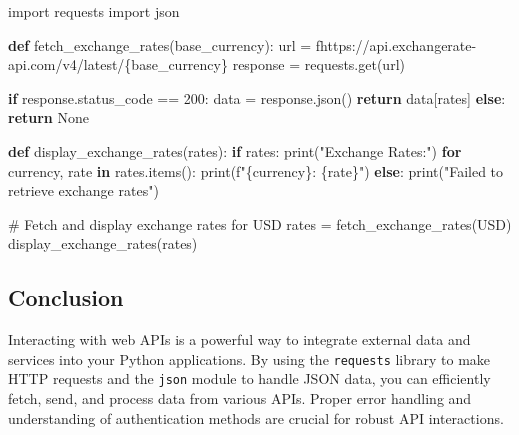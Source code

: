 \documentclass[
  letterpaper,
  DIV=11,
  numbers=noendperiod]{scrreprt}
\newenvironment{Shaded}{\begin{snugshade}}{\end{snugshade}}
\newcommand{\BuiltInTok}[1]{\textcolor[rgb]{0.00,0.23,0.31}{#1}}
\newcommand{\CommentTok}[1]{\textcolor[rgb]{0.37,0.37,0.37}{#1}}
\newcommand{\ControlFlowTok}[1]{\textcolor[rgb]{0.00,0.23,0.31}{\textbf{#1}}}
\newcommand{\DecValTok}[1]{\textcolor[rgb]{0.68,0.00,0.00}{#1}}
\newcommand{\ImportTok}[1]{\textcolor[rgb]{0.00,0.46,0.62}{#1}}
\newcommand{\KeywordTok}[1]{\textcolor[rgb]{0.00,0.23,0.31}{\textbf{#1}}}
\newcommand{\NormalTok}[1]{\textcolor[rgb]{0.00,0.23,0.31}{#1}}
\newcommand{\OperatorTok}[1]{\textcolor[rgb]{0.37,0.37,0.37}{#1}}
\newcommand{\SpecialCharTok}[1]{\textcolor[rgb]{0.37,0.37,0.37}{#1}}
\newcommand{\SpecialStringTok}[1]{\textcolor[rgb]{0.13,0.47,0.30}{#1}}
\newcommand{\StringTok}[1]{\textcolor[rgb]{0.13,0.47,0.30}{#1}}
\newcommand{\VariableTok}[1]{\textcolor[rgb]{0.07,0.07,0.07}{#1}}
\begin{document}
\begin{Shaded}
\begin{Highlighting}[]
\ImportTok{import}\NormalTok{ requests}
\ImportTok{import}\NormalTok{ json}

\KeywordTok{def}\NormalTok{ fetch\_exchange\_rates(base\_currency):}
\NormalTok{    url }\OperatorTok{=} \SpecialStringTok{f\textquotesingle{}https://api.exchangerate{-}api.com/v4/latest/}\SpecialCharTok{\{}\NormalTok{base\_currency}\SpecialCharTok{\}}\SpecialStringTok{\textquotesingle{}}
\NormalTok{    response }\OperatorTok{=}\NormalTok{ requests.get(url)}
    
    \ControlFlowTok{if}\NormalTok{ response.status\_code }\OperatorTok{==} \DecValTok{200}\NormalTok{:}
\NormalTok{        data }\OperatorTok{=}\NormalTok{ response.json()}
        \ControlFlowTok{return}\NormalTok{ data[}\StringTok{\textquotesingle{}rates\textquotesingle{}}\NormalTok{]}
    \ControlFlowTok{else}\NormalTok{:}
        \ControlFlowTok{return} \VariableTok{None}

\KeywordTok{def}\NormalTok{ display\_exchange\_rates(rates):}
    \ControlFlowTok{if}\NormalTok{ rates:}
        \BuiltInTok{print}\NormalTok{(}\StringTok{"Exchange Rates:"}\NormalTok{)}
        \ControlFlowTok{for}\NormalTok{ currency, rate }\KeywordTok{in}\NormalTok{ rates.items():}
            \BuiltInTok{print}\NormalTok{(}\SpecialStringTok{f"}\SpecialCharTok{\{}\NormalTok{currency}\SpecialCharTok{\}}\SpecialStringTok{: }\SpecialCharTok{\{}\NormalTok{rate}\SpecialCharTok{\}}\SpecialStringTok{"}\NormalTok{)}
    \ControlFlowTok{else}\NormalTok{:}
        \BuiltInTok{print}\NormalTok{(}\StringTok{"Failed to retrieve exchange rates"}\NormalTok{)}

\CommentTok{\# Fetch and display exchange rates for USD}
\NormalTok{rates }\OperatorTok{=}\NormalTok{ fetch\_exchange\_rates(}\StringTok{\textquotesingle{}USD\textquotesingle{}}\NormalTok{)}
\NormalTok{display\_exchange\_rates(rates)}
\end{Highlighting}
\end{Shaded}

\subsection{Conclusion}\label{conclusion-17}

Interacting with web APIs is a powerful way to integrate external data
and services into your Python applications. By using the
\texttt{requests} library to make HTTP requests and the \texttt{json}
module to handle JSON data, you can efficiently fetch, send, and process
data from various APIs. Proper error handling and understanding of
authentication methods are crucial for robust API interactions.
\end{document}
